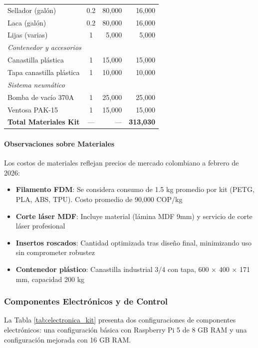 \begin{table}[H]
\begin{tabular}{|l|c|r|r|}
\hline
Sellador (galón) & 0.2 & 80,000 & 16,000 \\
Laca (galón) & 0.2 & 80,000 & 16,000 \\
Lijas (varias) & 1 & 5,000 & 5,000 \\
\hline
\multicolumn{4}{|l|}{\textit{Contenedor y accesorios}} \\
\hline
Canastilla plástica & 1 & 15,000 & 15,000 \\
Tapa canastilla plástica & 1 & 10,000 & 10,000 \\
\hline
\multicolumn{4}{|l|}{\textit{Sistema neumático}} \\
\hline
Bomba de vacío 370A & 1 & 25,000 & 25,000 \\
Ventosa PAK-15 & 1 & 15,000 & 15,000 \\
\hline
\textbf{Total Materiales Kit} & --- & --- & \textbf{313,030} \\
\hline
\end{tabular}
\end{table}

\paragraph{Observaciones sobre Materiales}

Los costos de materiales reflejan precios de mercado colombiano a febrero de 2026:

\begin{itemize}
    \item \textbf{Filamento FDM}: Se considera consumo de 1.5 kg promedio por kit (PETG, PLA, ABS, TPU). Costo promedio de 90,000 COP/kg
    \item \textbf{Corte láser MDF}: Incluye material (lámina MDF 9mm) y servicio de corte láser profesional
    \item \textbf{Insertos roscados}: Cantidad optimizada tras diseño final, minimizando uso sin comprometer robustez
    \item \textbf{Contenedor plástico}: Canastilla industrial 3/4 con tapa, 600 × 400 × 171 mm, capacidad 200 kg
\end{itemize}

\subsubsection{Componentes Electrónicos y de Control}

La Tabla \ref{tab:electronica_kit} presenta dos configuraciones de componentes electrónicos: una configuración básica con Raspberry Pi 5 de 8 GB RAM y una configuración mejorada con 16 GB RAM.

